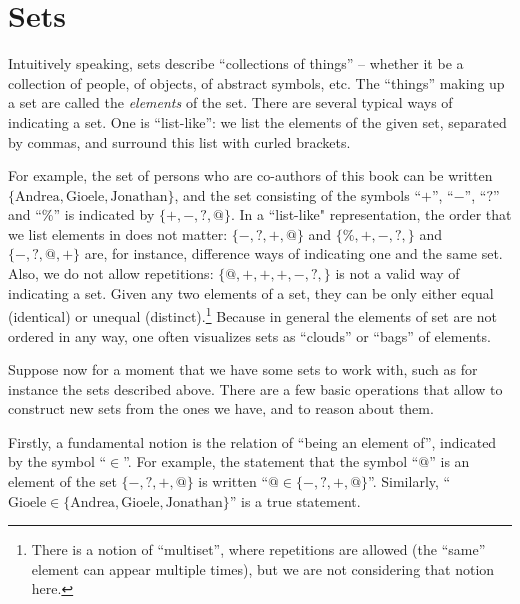 

\section{Sets}


Intuitively speaking, sets describe ``collections of things'' -- whether it be a collection of people, of objects, of abstract symbols, etc.
The ``things'' making up a set are called the \emph{elements} of the set.
There are several typical ways of indicating a set.
One is ``list-like'':
we list the elements of the given set, separated by commas, and surround this list with curled brackets.


For example, the set of persons who are co-authors of this book can be written $\{ \text{Andrea}, \text{Gioele}, \text{Jonathan} \}$, and the set consisting of the symbols ``$+$'', ``$-$'', ``$?$'' and ``$\%$'' is indicated by $\{ +, -, ?, @ \}$.
In a ``list-like" representation, the order that we list elements in does not matter: $\{ -, ?, +, @ \}$ and $\{ \%, +, -, ?, \}$ and $\{ -, ?, @, + \}$ are, for instance, difference ways of indicating one and the same set.
Also, we do not allow repetitions: $\{ @, +, +, +, -, ?, \}$ is not a valid way of indicating a set.
Given any two elements of a set, they can be only either equal (identical) or unequal (distinct).\footnote{There is a notion of ``multiset'', where repetitions are allowed (the ``same'' element can appear multiple times), but we are not considering that notion here.} Because in general the elements of set are not ordered in any way, one often visualizes sets as ``clouds'' or ``bags'' of elements.


Suppose now for a moment that we have some sets to work with, such as for instance the sets described above.
There are a few basic operations that allow to construct new sets from the ones we have, and to reason about them.


Firstly, a fundamental notion is the relation of ``being an element of'', indicated by the symbol ``$\in$''.
For example, the statement that the symbol ``$@$'' is an element of the set $\{ -, ?, +, @ \}$ is written ``$@ \in \{ -, ?, +, @ \}$''.
Similarly, ``$\text{Gioele} \in \{ \text{Andrea}, \text{Gioele}, \text{Jonathan} \}$'' is a true statement.

